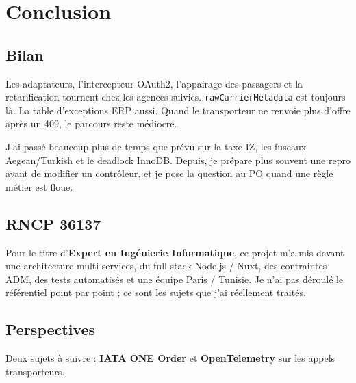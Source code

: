 \chapter{Conclusion}
\label{chap:conclusion}

\section{Bilan}

Les adaptateurs, l'intercepteur OAuth2, l'appairage des passagers et la retarification tournent chez les agences suivies. \texttt{rawCarrierMetadata} est toujours là. La table d'exceptions ERP aussi. Quand le transporteur ne renvoie plus d'offre après un 409, le parcours reste médiocre.

J'ai passé beaucoup plus de temps que prévu sur la taxe IZ, les fuseaux Aegean/Turkish et le deadlock InnoDB. Depuis, je prépare plus souvent une repro avant de modifier un contrôleur, et je pose la question au PO quand une règle métier est floue.

\section{RNCP 36137}

Pour le titre d'\textbf{Expert en Ingénierie Informatique}, ce projet m'a mis devant une architecture multi-services, du full-stack Node.js / Nuxt, des contraintes ADM, des tests automatisés et une équipe Paris / Tunisie. Je n'ai pas déroulé le référentiel point par point ; ce sont les sujets que j'ai réellement traités.

\section{Perspectives}

Deux sujets à suivre : \textbf{IATA ONE Order} et \textbf{OpenTelemetry} sur les appels transporteurs.
